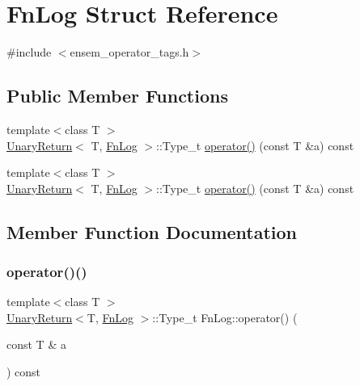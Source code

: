 \hypertarget{structFnLog}{}\section{Fn\+Log Struct Reference}
\label{structFnLog}


{\ttfamily \#include $<$ensem\+\_\+operator\+\_\+tags.\+h$>$}

\subsection*{Public Member Functions}
\begin{DoxyCompactItemize}
\item 
{\footnotesize template$<$class T $>$ }\\\mbox{\hyperlink{structUnaryReturn}{Unary\+Return}}$<$ T, \mbox{\hyperlink{structFnLog}{Fn\+Log}} $>$\+::Type\+\_\+t \mbox{\hyperlink{structFnLog_a888c66c42f3d71caf35dd0d0cf80d6fb}{operator()}} (const T \&a) const
\item 
{\footnotesize template$<$class T $>$ }\\\mbox{\hyperlink{structUnaryReturn}{Unary\+Return}}$<$ T, \mbox{\hyperlink{structFnLog}{Fn\+Log}} $>$\+::Type\+\_\+t \mbox{\hyperlink{structFnLog_a888c66c42f3d71caf35dd0d0cf80d6fb}{operator()}} (const T \&a) const
\end{DoxyCompactItemize}


\subsection{Member Function Documentation}
\mbox{\label{structFnLog_a888c66c42f3d71caf35dd0d0cf80d6fb}} 
\subsubsection{\texorpdfstring{operator()()}{operator()()}\hspace{0.1cm}{\footnotesize\ttfamily [1/2]}}
{\footnotesize\ttfamily template$<$class T $>$ \\
\mbox{\hyperlink{structUnaryReturn}{Unary\+Return}}$<$T, \mbox{\hyperlink{structFnLog}{Fn\+Log}} $>$\+::Type\+\_\+t Fn\+Log\+::operator() (\begin{DoxyParamCaption}\item[{const T \&}]{a }\end{DoxyParamCaption}) const\hspace{0.3cm}{\ttfamily [inline]}}

